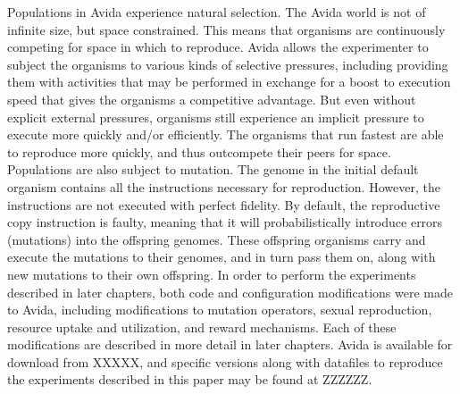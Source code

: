 Populations in Avida experience natural selection. The Avida world is not of infinite size, but space constrained. This means that organisms are continuously competing for space in which to reproduce.  Avida allows the experimenter to subject the organisms to various kinds of selective pressures, including providing them with activities that may be performed in exchange for a boost to execution speed that gives the organisms a competitive advantage. But even without explicit external pressures, organisms still experience an implicit pressure to execute more quickly and/or efficiently. The organisms that run fastest are able to reproduce more quickly, and thus outcompete their peers for space.  
Populations are also subject to mutation. The genome in the initial default organism contains all the instructions necessary for reproduction. However, the instructions are not executed with perfect fidelity. By default, the reproductive copy instruction is faulty, meaning that it will probabilistically introduce errors (mutations) into the offspring genomes. These offspring organisms carry and execute the mutations to their genomes, and in turn pass them on, along with new mutations to their own offspring.
In order to perform the experiments described in later chapters, both code and configuration modifications were made to Avida, including modifications to mutation operators, sexual reproduction, resource uptake and utilization, and reward mechanisms. Each of these modifications are described in more detail in later chapters.
Avida is available for download from XXXXX, and specific versions along with datafiles to reproduce the experiments described in this paper may be found at ZZZZZZ.
